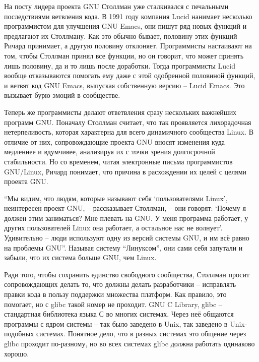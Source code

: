На посту лидера проекта GNU Столлман уже сталкивался с печальными последствиями ветвления кода. В 1991 году компания Lucid нанимает несколько программистом для улучшения GNU Emacs, они пишут ряд новых функций и предлагают их Столлману. Как это обычно бывает, половину этих функций Ричард принимает, а другую половину отклоняет. Программисты настаивают на том, чтобы Столлман принял все функции, но он говорит, что может принять лишь половину, да и то лишь после доработки. Тогда программисты Lucid вообще отказываются помогать ему даже с этой одобренной половиной функций, и ветвят код GNU Emacs, выпуская собственную версию -- Lucid Emacs. Это вызывает бурю эмоций в сообществе.

Теперь же программисты делают ответвления сразу нескольких важнейших программ GNU. Поначалу Столлман считает, что так проявляется лихорадочная нетерпеливость, которая характерна для всего динамичного сообщества Linux. В отличие от них, сопровождающие проекта GNU вносят изменения куда медленнее и вдумчивее, анализируя их с точки зрения долгосрочной стабильности. Но со временем, читая электронные письма программистов GNU/Linux, Ричард понимает, что причина в расхождении их целей с целями проекта GNU.

\enquote{Мы видим, что людям, которые называют себя \enquote{пользователями Linux}, неинтересен проект GNU, -- рассказывает Столлман, -- они говорят: \enquote{Почему я должен этим заниматься? Мне плевать на GNU. У меня программа работает, у других пользователей Linux она работает, а остальное нас не волнует}. Удивительно -- люди используют одну из версий системы GNU, и им всё равно на проблемы GNU}. Называя систему \enquote{Линуксом}, они сами себя запутали и забыли, что их система больше GNU, чем Linux.

Ради того, чтобы сохранить единство свободного сообщества, Столлман просит сопровождающих делать то, что должны делать разработчики -- исправлять правки кода в пользу поддержки множества платформ. Как правило, это помогает, но с glibc такой номер не проходит. GNU C Library, glibc -- стандартная библиотека языка С во многих системах. Через неё общаются программы с ядром системы -- так было заведено в Unix, так заведено в Unix-подобных системах. Понятное дело, что в разных системах это общение через glibc проходит по-разному, но во всех системах glibc должна работать одинаково хорошо.

